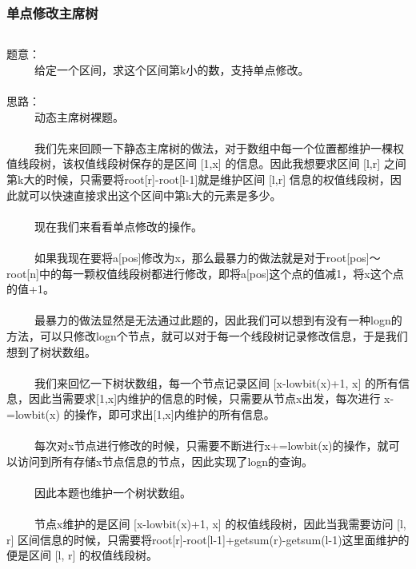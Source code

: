 \documentclass[twoside]{article}
\begin{document}
\subsubsection{单点修改主席树}
\begin{lstlisting}
\end{lstlisting}
题意：\\
      给定一个区间，求这个区间第k小的数，支持单点修改。\\
\\
思路：\\
      动态主席树裸题。\\
\\
      我们先来回顾一下静态主席树的做法，对于数组中每一个位置都维护一棵权值线段树，该权值线段树保存的是区间 [1,x] 的信息。因此我想要求区间 [l,r] 之间第k大的时候，只需要将root[r]-root[l-1]就是维护区间 [l,r] 信息的权值线段树，因此就可以快速直接求出这个区间中第k大的元素是多少。\\
\\
      现在我们来看看单点修改的操作。\\
\\
      如果我现在要将a[pos]修改为x，那么最暴力的做法就是对于root[pos]～root[n]中的每一颗权值线段树都进行修改，即将a[pos]这个点的值减1，将x这个点的值+1。\\
\\
      最暴力的做法显然是无法通过此题的，因此我们可以想到有没有一种logn的方法，可以只修改logn个节点，就可以对于每一个线段树记录修改信息，于是我们想到了树状数组。\\
\\
      我们来回忆一下树状数组，每一个节点记录区间 [x-lowbit(x)+1, x] 的所有信息，因此当需要求[1,x]内维护的信息的时候，只需要从节点x出发，每次进行 x-=lowbit(x) 的操作，即可求出[1,x]内维护的所有信息。\\
\\
      每次对x节点进行修改的时候，只需要不断进行x+=lowbit(x)的操作，就可以访问到所有存储x节点信息的节点，因此实现了logn的查询。\\
\\
      因此本题也维护一个树状数组。\\
\\
      节点x维护的是区间 [x-lowbit(x)+1, x] 的权值线段树，因此当我需要访问 [l, r] 区间信息的时候，只需要将root[r]-root[l-1]+getsum(r)-getsum(l-1)这里面维护的便是区间 [l, r] 的权值线段树。\\
\end{document}
